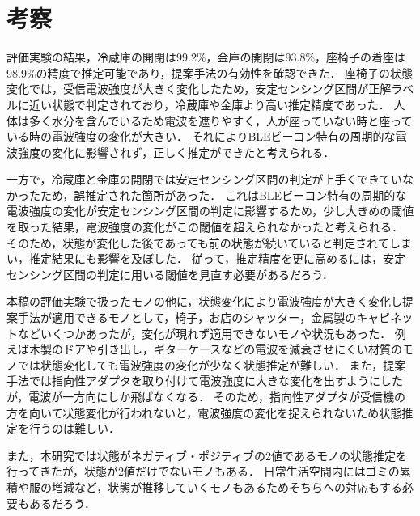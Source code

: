 \section{考察}
評価実験の結果，冷蔵庫の開閉は99.2\%，金庫の開閉は93.8\%，座椅子の着座は98.9\%の精度で推定可能であり，提案手法の有効性を確認できた．
座椅子の状態変化では，受信電波強度が大きく変化したため，安定センシング区間が正解ラベルに近い状態で判定されており，冷蔵庫や金庫より高い推定精度であった．
人体は多く水分を含んでいるため電波を遮りやすく，人が座っていない時と座っている時の電波強度の変化が大きい．
それによりBLEビーコン特有の周期的な電波強度の変化に影響されず，正しく推定ができたと考えられる．

一方で，冷蔵庫と金庫の開閉では安定センシング区間の判定が上手くできていなかったため，誤推定された箇所があった．
これはBLEビーコン特有の周期的な電波強度の変化が安定センシング区間の判定に影響するため，少し大きめの閾値を取った結果，電波強度の変化がこの閾値を超えられなかったと考えられる．
そのため，状態が変化した後であっても前の状態が続いていると判定されてしまい，推定結果にも影響を及ぼした．
従って，推定精度を更に高めるには，安定センシング区間の判定に用いる閾値を見直す必要があるだろう．

本稿の評価実験で扱ったモノの他に，状態変化により電波強度が大きく変化し提案手法が適用できるモノとして，椅子，お店のシャッター，金属製のキャビネットなどいくつかあったが，変化が現れず適用できないモノや状況もあった．
例えば木製のドアや引き出し，ギターケースなどの電波を減衰させにくい材質のモノでは状態変化しても電波強度の変化が少なく状態推定が難しい．
また，提案手法では指向性アダプタを取り付けて電波強度に大きな変化を出すようにしたが，電波が一方向にしか飛ばなくなる．
そのため，指向性アダプタが受信機の方を向いて状態変化が行われないと，電波強度の変化を捉えられないため状態推定を行うのは難しい．

また，本研究では状態がネガティブ・ポジティブの2値であるモノの状態推定を行ってきたが，状態が2値だけでないモノもある．
日常生活空間内にはゴミの累積や服の増減など，状態が推移していくモノもあるためそちらへの対応もする必要もあるだろう．
